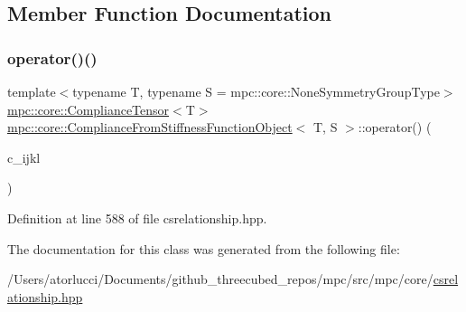 \subsection{Member Function Documentation}
\mbox{\label{structmpc_1_1core_1_1_compliance_from_stiffness_function_object_a448ccc3a0f1af070f75623e3a651fcb5}} 
\subsubsection{\texorpdfstring{operator()()}{operator()()}}
{\footnotesize\ttfamily template$<$typename T, typename S = mpc\+::core\+::\+None\+Symmetry\+Group\+Type$>$ \\
\mbox{\hyperlink{structmpc_1_1core_1_1_compliance_tensor}{mpc\+::core\+::\+Compliance\+Tensor}}$<$T$>$ \mbox{\hyperlink{structmpc_1_1core_1_1_compliance_from_stiffness_function_object}{mpc\+::core\+::\+Compliance\+From\+Stiffness\+Function\+Object}}$<$ T, S $>$\+::operator() (\begin{DoxyParamCaption}\item[{const \mbox{\hyperlink{structmpc_1_1core_1_1_stiffness_tensor}{mpc\+::core\+::\+Stiffness\+Tensor}}$<$ T $>$ \&}]{c\+\_\+ijkl }\end{DoxyParamCaption})\hspace{0.3cm}{\ttfamily [inline]}}



Definition at line 588 of file csrelationship.\+hpp.



The documentation for this class was generated from the following file\+:\begin{DoxyCompactItemize}
\item 
/\+Users/atorlucci/\+Documents/github\+\_\+threecubed\+\_\+repos/mpc/src/mpc/core/\mbox{\hyperlink{csrelationship_8hpp}{csrelationship.\+hpp}}\end{DoxyCompactItemize}
